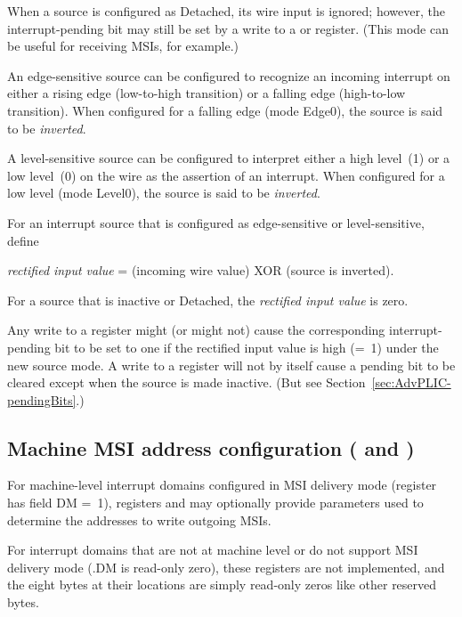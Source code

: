When a source is configured as Detached, its wire input is ignored;
however, the interrupt-pending bit may still be set by a write to a
 or  register.
(This mode can be useful for receiving MSIs, for example.)

An edge-sensitive source can be configured to recognize an incoming
interrupt on either a rising edge (low-to-high transition) or a falling
edge (high-to-low transition).
When configured for a falling edge (mode Edge0), the source is said to
be \emph{inverted}.

A level-sensitive source can be configured to interpret either a
high level~(1) or a low level~(0) on the wire as the assertion of an
interrupt.
When configured for a low level (mode Level0), the source is said to be
\emph{inverted}.

For an interrupt source that is configured as edge-sensitive or
level-sensitive, define\nopagebreak
\begin{displayLinesTable}
\emph{rectified input value} = (incoming wire value) XOR (source is inverted).
\end{displayLinesTable}
For a source that is inactive or Detached, the
\emph{rectified input value} is zero.

Any write to a  register might (or might not) cause the
corresponding interrupt-pending bit to be set to one if the rectified
input value is high (=~1) under the new source mode.
A write to a  register will not by itself cause a pending
bit to be cleared except when the source is made inactive.
(But see Section~\ref{sec:AdvPLIC-pendingBits}.)

\subsection{%
Machine MSI address configuration
 ( and )%
}
\label{sec:AdvPLIC-reg-mmsiaddrcfg}

For machine-level interrupt domains configured in MSI delivery mode
(register  has field DM =~1), registers 
and  may optionally provide parameters used to
determine the addresses to write outgoing MSIs.

For interrupt domains that are not at machine level or do not support
MSI delivery mode (.DM is read-only zero), these registers
are not implemented, and the eight bytes at their locations are simply
read-only zeros like other reserved bytes.

